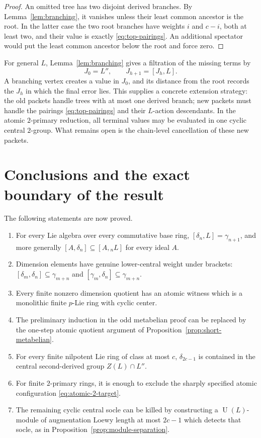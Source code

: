 \documentclass[a4paper,11pt,reqno]{amsart}
\theoremstyle{definition}
\theoremstyle{remark}
\newcommand{\U}{\operatorname U}
\newcommand{\dlt}{\delta}
\newcommand{\gm}{\gamma}
\begin{document}
\begin{proof}
An omitted tree has two disjoint derived branches.  By
Lemma~\ref{lem:branching}, it vanishes unless their least common ancestor is
the root.  In the latter case the two root branches have weights $i$ and
$c-i$, both at least two, and their value is exactly \eqref{eq:top-pairings}.
An additional spectator would put the least common ancestor below the root
and force zero.
\end{proof}

For general $L$, Lemma~\ref{lem:branching} gives a filtration of the missing
terms by
\[
 J_0=L'',\qquad J_{h+1}=[J_h,L].
\]
A branching vertex creates a value in $J_0$, and its distance from the root
records the $J_h$ in which the final error lies.  This supplies a concrete
extension strategy: the old packets handle trees with at most one derived
branch; new packets must handle the pairings \eqref{eq:top-pairings} and their
$L$-action descendants.  In the atomic $2$-primary reduction, all terminal
values may be evaluated in one cyclic central $2$-group.  What remains open
is the chain-level cancellation of these new packets.

\section{Conclusions and the exact boundary of the result}

The following statements are now proved.
\begin{enumerate}
\item For every Lie algebra over every commutative base ring,
\([\dlt_n,L]=\gm_{n+1}\), and more generally
$[A,\dlt_n]\subseteq[A,{}_nL]$ for every ideal $A$.
\item Dimension elements have genuine lower-central weight under brackets:
$[\dlt_m,\dlt_n]\subseteq\gm_{m+n}$ and
$[\gm_m,\dlt_n]\subseteq\gm_{m+n}$.
\item Every finite nonzero dimension quotient has an atomic witness which is
a monolithic finite $p$-Lie ring with cyclic center.
\item The preliminary induction in the odd metabelian proof can be replaced
by the one-step atomic quotient argument of
Proposition~\ref{prop:short-metabelian}.
\item For every finite nilpotent Lie ring of class at most $c$,
$\dlt_{2c-1}$ is contained in the central second-derived group
$Z(L)\cap L''$.
\item For finite $2$-primary rings, it is enough to exclude the sharply
specified atomic configuration \eqref{eq:atomic-2-target}.
\item The remaining cyclic central socle can be killed by constructing a
$\U(L)$-module of augmentation Loewy length at most $2c-1$ which detects that
socle, as in Proposition~\ref{prop:module-separation}.
\end{enumerate}
\end{document}
